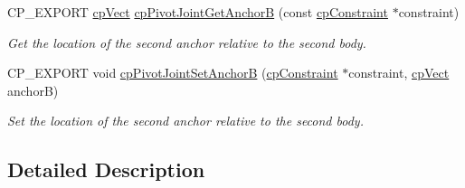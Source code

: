 \begin{DoxyCompactItemize}
\mbox{\label{group__cpPivotJoint_ga943cf22aaf64d81b0997649edbacdeb8}} 
C\+P\+\_\+\+E\+X\+P\+O\+RT \hyperlink{structcpVect}{cp\+Vect} \hyperlink{group__cpPivotJoint_ga943cf22aaf64d81b0997649edbacdeb8}{cp\+Pivot\+Joint\+Get\+AnchorB} (const \hyperlink{structcpConstraint}{cp\+Constraint} $\ast$constraint)
\begin{DoxyCompactList}\small\item\em Get the location of the second anchor relative to the second body. \end{DoxyCompactList}\item 
\mbox{\label{group__cpPivotJoint_ga433e38d1b11055495205880e93a499cc}} 
C\+P\+\_\+\+E\+X\+P\+O\+RT void \hyperlink{group__cpPivotJoint_ga433e38d1b11055495205880e93a499cc}{cp\+Pivot\+Joint\+Set\+AnchorB} (\hyperlink{structcpConstraint}{cp\+Constraint} $\ast$constraint, \hyperlink{structcpVect}{cp\+Vect} anchorB)
\begin{DoxyCompactList}\small\item\em Set the location of the second anchor relative to the second body. \end{DoxyCompactList}\end{DoxyCompactItemize}


\subsection{Detailed Description}
